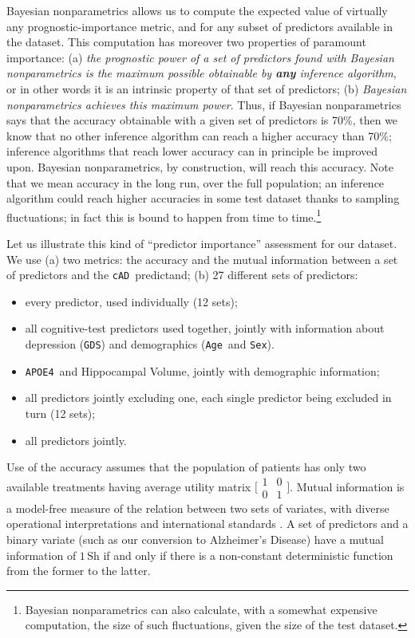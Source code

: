 \documentclass[a4paper,12pt,%
onecolumn,oneside,article,%
british%
]{memoir}
\theoremstyle{remark}
\theoremstyle{innote}
\newcommand*{\wrench}{{\fontencoding{U}\fontfamily{fontawesomethree}\selectfont\symbol{114}}}
\newcommand{\mynotew}[1]{{\footnotesize\color{notecolour}\wrench\ #1}}
\renewcommand*{\|}[1][]{\nonscript\:#1\vert\nonscript\:\mathopen{}}
\newcommand*{\age}{\texttt{Age}}
\newcommand*{\sex}{\texttt{Sex}}
\newcommand*{\apoe}{\texttt{APOE4}}
\newcommand*{\gds}{\texttt{GDS}}
\newcommand*{\cad}{\texttt{cAD}}
\newcommand*{\ad}{Alzheimer's Disease}
\begin{document}
Bayesian nonparametrics allows us to compute the expected value of virtually any prognostic-importance metric, and for any subset of predictors available in the dataset. This computation has moreover two properties of paramount importance: (a) \emph{the prognostic power of a set of predictors found with Bayesian nonparametrics is the maximum possible obtainable by \textbf{any} inference algorithm}, or in other words it is an intrinsic property of that set of predictors; (b) \emph{Bayesian nonparametrics achieves this maximum power}. Thus, if Bayesian nonparametrics says that the accuracy obtainable with a given set of predictors is 70\%, then we know that no other inference algorithm can reach a higher accuracy than 70\%; inference algorithms that reach lower accuracy can in principle be improved upon. Bayesian nonparametrics, by construction, will reach this accuracy. Note that we mean accuracy in the long run, over the full population; an inference algorithm could reach higher accuracies in some test dataset thanks to sampling fluctuations; in fact this is bound to happen from time to time.\footnote{Bayesian nonparametrics can also calculate, with a somewhat expensive computation, the size of such fluctuations, given the size of the test dataset.}

Let us illustrate this kind of \enquote{predictor importance} assessment for our dataset. We use (a) two metrics: the accuracy and the mutual information \autocites{shannon1948,coveretal1991_r2006} between a set of predictors and the \cad\ predictand; (b) 27 different sets of predictors:
\begin{itemize}
\item every predictor, used individually (12 sets);
\item all cognitive-test predictors used together, jointly with information about depression (\gds) and demographics (\age\ and \sex).
\item \apoe\ and Hippocampal Volume, jointly with demographic information;
\item all predictors jointly excluding one, each single predictor being excluded in turn (12 sets);
\item all predictors jointly.
\end{itemize}

Use of the accuracy assumes that the population of patients has only two available treatments having average utility matrix $\bigl[\begin{smallmatrix} 1&0\\0&1 \end{smallmatrix}\bigr]$. Mutual information is a model-free measure of the relation between two sets of variates, with diverse operational interpretations \autocites{mackay1995_r2005,woodward1953_r1964,minka1998d_r2003,good1961b,goodetal1968,kelly1956,kullback1959_r1978} and international standards \autocites{iso2008c}. A set of predictors and a binary variate (such as our conversion to \ad) have a mutual information of $1\,\mathrm{Sh}$ if and only if there is a non-constant deterministic function from the former to the latter.
\end{document}

